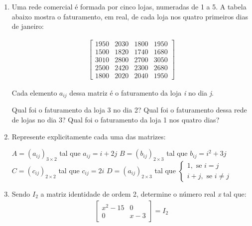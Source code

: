 \begin{multicols}{2}
  \begin{enumerate}[label*=\protect\fbox{\arabic{enumi}}]
    \item {
        Uma rede comercial é formada por cinco lojas, numeradas de 1 a 5. A tabela abaixo mostra o faturamento, em real, de 
        cada loja nos quatro primeiros dias de janeiro:

        \begin{equation*}
            \begin{split}
              \begin{bmatrix}
                1950 & 2030 & 1800 & 1950 \\
                1500 & 1820 & 1740 & 1680 \\
                3010 & 2800 & 2700 & 3050 \\
                2500 & 2420 & 2300 & 2680 \\
                1800 & 2020 & 2040 & 1950 
              \end{bmatrix}
            \end{split}
        \end{equation*}

        Cada elemento $a_{ij}$ dessa matriz é o faturamento da loja \textit{i} no dia \textit{j}. 

        \begin{tasks}
          \task Qual foi o faturamento da loja 3 no dia 2?
          \task Qual foi o faturamento dessa rede de lojas no dia 3?
          \task Qual foi o faturamento da loja 1 nos quatro dias?
        \end{tasks}
      }
    \item {
        Represente explicitamente cada uma das matrizes:
        \begin{tasks}
          \task $A = (a_{ij})_{3 \times 2}$ tal que $a_{ij} = i + 2j$
          \task $B = (b_{ij})_{2 \times 3}$ tal que $b_{ij} = i^2 + 3j$
          \task $C = (c_{ij})_{2 \times 2}$ tal que $c_{ij} = 2i$
          \task $D = (a_{ij})_{2 \times 3}$ tal que $\begin{cases} 1, \text{ se } i = j \\ i + j, \text{ se } i \neq j \end{cases}$
        \end{tasks}
      }

    \item {
        Sendo $I_2$ a matriz identidade de ordem 2, determine o número real \textit{x} tal que:
        \begin{equation*}
            \begin{split}
              \begin{bmatrix}
                x^2 - 15 & 0 \\
                0 & x - 3 
              \end{bmatrix} = I_2
            \end{split}
        \end{equation*}
      }


\end{enumerate}
\end{multicols}
